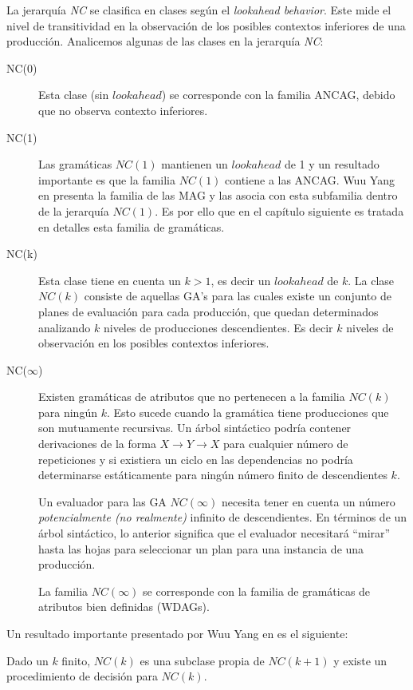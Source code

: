 La jerarquía \emph{NC} se clasifica en clases según el \textit{lookahead behavior}. Este mide el nivel de transitividad en la observación de los posibles contextos inferiores de una producción. Analicemos algunas de las clases en la jerarquía \emph{NC}:
\begin{description}
\item [NC(0)] Esta clase (sin $lookahead$) se corresponde con la familia ANCAG, debido que no observa contexto inferiores. 
\item [NC(1)] Las gramáticas $NC(1)$ mantienen un $lookahead$ de 1 y un resultado importante es que la familia $NC(1)$ contiene a las ANCAG. Wuu Yang en \cite{wuu-yang1} presenta la familia de las MAG y las asocia con esta subfamilia dentro de la jerarquía $NC(1)$. Es por ello que en el capítulo siguiente es tratada en detalles esta familia de gramáticas.
\item[NC(k)] Esta clase tiene en cuenta un $k>1$, es decir un $lookahead$ de $k$. La clase $NC(k)$ consiste de aquellas GA's para las cuales existe un conjunto de planes de evaluación para cada producción, que quedan determinados analizando $k$ niveles de producciones descendientes. Es decir $k$ niveles de observación en los posibles contextos inferiores.
\item[NC($\infty$)] Existen gramáticas de atributos que no pertenecen a la familia $NC(k)$ para ningún $k$. Esto sucede cuando la gramática tiene producciones que son mutuamente recursivas. Un árbol sintáctico podría contener derivaciones de la forma $X \rightarrow Y \rightarrow X$ para cualquier número de repeticiones y si existiera un ciclo en las dependencias no podría determinarse estáticamente para ningún número finito de descendientes $k$.

Un evaluador para las GA $NC(\infty)$ necesita tener en cuenta un número \emph{potencialmente (no realmente)} infinito de descendientes. En términos de un árbol sintáctico, lo anterior significa que el evaluador necesitará ``mirar'' hasta las hojas para seleccionar un plan para una instancia de una producción.

\begin{theorem} La familia $NC(\infty)$ se corresponde con la familia de gramáticas de atributos bien definidas (WDAGs).
\end{theorem}
\end{description}

Un resultado importante presentado por Wuu Yang en \cite{wuu-yang2} es el siguiente:
\begin{theorem}
Dado un $k$ finito, $NC(k)$ es una subclase propia de $NC(k+1)$ y existe un procedimiento de decisión para $NC(k)$.
\end{theorem}


